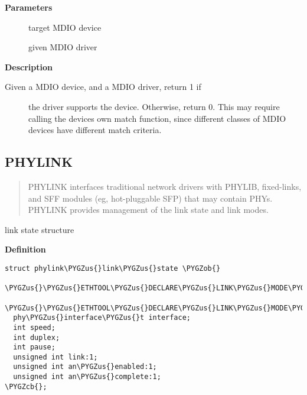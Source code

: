 \documentclass[a4paper,8pt,english]{sphinxmanual}
\def\PYGZus{\char`\_}
\def\PYGZob{\char`\{}
\def\PYGZcb{\char`\}}
\begin{document}
\textbf{Parameters}
\begin{description}
\item[{}] \leavevmode
target MDIO device

\item[{}] \leavevmode
given MDIO driver

\end{description}

\textbf{Description}
\begin{description}
\item[{Given a MDIO device, and a MDIO driver, return 1 if}] \leavevmode
the driver supports the device.  Otherwise, return 0. This may
require calling the devices own match function, since different classes
of MDIO devices have different match criteria.

\end{description}


\subsection{PHYLINK}
\label{networking/kapi:phylink}\begin{quote}

PHYLINK interfaces traditional network drivers with PHYLIB, fixed-links,
and SFF modules (eg, hot-pluggable SFP) that may contain PHYs.  PHYLINK
provides management of the link state and link modes.
\end{quote}

\begin{fulllineitems}
\label{networking/kapi:c.phylink_link_state}
link state structure

\end{fulllineitems}


\textbf{Definition}

\begin{Verbatim}[commandchars=\\\{\}]
struct phylink\PYGZus{}link\PYGZus{}state \PYGZob{}
  \PYGZus{}\PYGZus{}ETHTOOL\PYGZus{}DECLARE\PYGZus{}LINK\PYGZus{}MODE\PYGZus{}MASK(advertising);
  \PYGZus{}\PYGZus{}ETHTOOL\PYGZus{}DECLARE\PYGZus{}LINK\PYGZus{}MODE\PYGZus{}MASK(lp\PYGZus{}advertising);
  phy\PYGZus{}interface\PYGZus{}t interface;
  int speed;
  int duplex;
  int pause;
  unsigned int link:1;
  unsigned int an\PYGZus{}enabled:1;
  unsigned int an\PYGZus{}complete:1;
\PYGZcb{};
\end{Verbatim}
\end{document}
